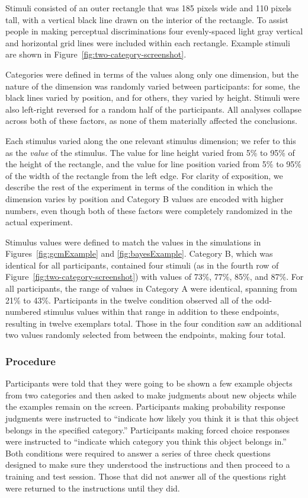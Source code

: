 \documentclass[doc,apacite]{apa6}
\begin{document}
Stimuli consisted of an outer rectangle that was 185 pixels wide and 110 pixels tall, with a vertical black line drawn on the interior of the rectangle. To assist people in making perceptual discriminations four evenly-spaced light gray vertical and horizontal grid lines were included within each rectangle. Example stimuli are shown in Figure~\ref{fig:two-category-screenshot}.

Categories were defined in terms of the values along only one dimension, but the nature of the dimension was randomly varied between participants: for some, the black lines varied by position, and for others, they varied by height. Stimuli were also left-right reversed for a random half of the participants. All analyses collapse across both of these factors, as none of them materially affected the conclusions.

Each stimulus varied along the one relevant stimulus dimension; we refer to this as the \textit{value} of the stimulus. The value for line height varied from 5\% to 95\% of the height of the rectangle, and the value for line position varied from 5\% to 95\% of the width of the rectangle from the left edge.
For clarity of exposition, we describe the rest of the experiment in terms of the condition in which the dimension varies by position and Category B values are encoded with higher numbers, even though both of these factors were completely randomized in the actual experiment.

Stimulus values were defined to match the values in the simulations in Figures~\ref{fig:gcmExample} and \ref{fig:bayesExample}. Category B, which was identical for all participants, contained four stimuli (as in the fourth row of Figure~\ref{fig:two-category-screenshot}) with values of 73\%, 77\%, 85\%, and 87\%. For all participants, the range of values in Category A were identical, spanning from 21\% to 43\%. Participants in the {\sc twelve} condition observed all of the odd-numbered stimulus values within that range in addition to these endpoints, resulting in twelve exemplars total. Those in the {\sc four} condition saw an additional two values randomly selected from between the endpoints, making four total.



\subsubsection{Procedure}

Participants were told that they were going to be shown a few example objects from two categories and then asked to make judgments about new objects while the examples remain on the screen. Participants making {\sc probability} response judgments were instructed to ``indicate how likely you think it is that this object belongs in the specified category.'' Participants making {\sc forced choice} responses were instructed to ``indicate which category you think this object belongs in.'' Both conditions were required to answer a series of three check questions designed to make sure they understood the instructions and then proceed to a training and test session. Those that did not answer all of the questions right were returned to the instructions until they did.
\end{document}
